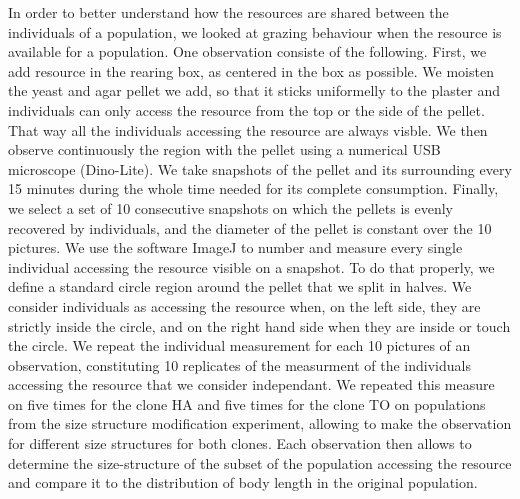 In order to better understand how the resources are shared between the
individuals of a population, we looked at grazing behaviour when the resource is
available for a population.
One observation consiste of the following. First, we add resource in the rearing
box, as centered in the box as possible. We moisten the yeast and agar pellet we
add, so that it sticks uniformelly to the plaster and individuals can only
access the resource from the top or the side of the pellet. That way all the
individuals accessing the resource are always visble. We then observe
continuously the region with the pellet using a numerical USB microscope
(Dino-Lite). We take snapshots of the pellet and its surrounding every 15
minutes during the whole time needed for its complete consumption. Finally, we
select a set of 10 consecutive snapshots on which the pellets is evenly
recovered by individuals, and the diameter of the pellet is constant over the 10
pictures.
We use the software ImageJ to number and measure every single individual
accessing the resource visible on a snapshot. To do that properly, we define a
standard circle region around the pellet that we split in halves. We consider
individuals as accessing the resource when, on the left side, they are strictly
inside the circle, and on the right hand side when they are inside or touch the
circle. We repeat the individual measurement for each 10 pictures of an
observation, constituting 10 replicates of the measurment of the individuals
accessing the resource that we consider independant.
We repeated this measure on five times for the clone HA and five times for the
clone TO on populations from the size structure modification experiment,
allowing to make the observation for different size structures for both clones.
Each observation then allows to determine the size-structure of the subset of
the population accessing the resource and compare it to the distribution of body
length in the original population.